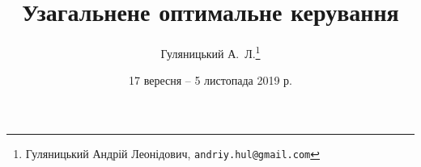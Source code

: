 
\usepackage[explicit]{hulianytskyi}

\title{Узагальнене оптимальне керування}
\author{Гуляницький А.~Л.\footnote{Гуляницький Андрій Леонідович, \texttt{andriy.hul@gmail.com}}}
\date{17 вересня -- 5 листопада 2019 р.}
\maketitle
\tableofcontents
\thispagestyle{empty}
\newpage










